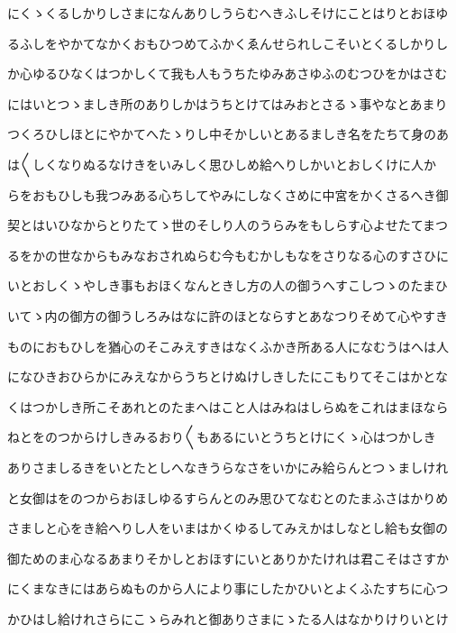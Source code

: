 \documentclass[a4paper,11pt,landscape]{ltjtarticle}
\begin{document}
にくゝくるしかりしさまになんありしうらむへきふしそけにことはりとおほゆ
\par\medskip
るふしをやかてなかくおもひつめてふかくゑんせられしこそいとくるしかりし
\par\medskip
か心ゆるひなくはつかしくて我も人もうちたゆみあさゆふのむつひをかはさむ
\par\medskip
にはいとつゝましき所のありしかはうちとけてはみおとさるゝ事やなとあまり
\par\medskip
つくろひしほとにやかてへたゝりし中そかしいとあるましき名をたちて身のあ
\par\medskip
は〱しくなりぬるなけきをいみしく思ひしめ給へりしかいとおしくけに人か
\par\medskip
らをおもひしも我つみある心ちしてやみにしなくさめに中宮をかくさるへき御
\par\medskip
契とはいひなからとりたてゝ世のそしり人のうらみをもしらす心よせたてまつ
\par\medskip
るをかの世なからもみなおされぬらむ今もむかしもなをさりなる心のすさひに
\par\medskip
いとおしくゝやしき事もおほくなんときし方の人の御うへすこしつゝのたまひ
\par\medskip
いてゝ内の御方の御うしろみはなに許のほとならすとあなつりそめて心やすき
\par\medskip
ものにおもひしを猶心のそこみえすきはなくふかき所ある人になむうはへは人
\par\medskip
になひきおひらかにみえなからうちとけぬけしきしたにこもりてそこはかとな
\par\medskip
くはつかしき所こそあれとのたまへはこと人はみねはしらぬをこれはまほなら
\par\medskip
ねとをのつからけしきみるおり〱もあるにいとうちとけにくゝ心はつかしき
\par\medskip
ありさましるきをいとたとしへなきうらなさをいかにみ給らんとつゝましけれ
\par\medskip
と女御はをのつからおほしゆるすらんとのみ思ひてなむとのたまふさはかりめ
\par\medskip
さましと心をき給へりし人をいまはかくゆるしてみえかはしなとし給も女御の
\par\medskip
御ためのま心なるあまりそかしとおほすにいとありかたけれは君こそはさすか
\par\medskip
にくまなきにはあらぬものから人により事にしたかひいとよくふたすちに心つ
\par\medskip
かひはし給けれさらにこゝらみれと御ありさまにゝたる人はなかりけりいとけ
\par\medskip
\end{document}
